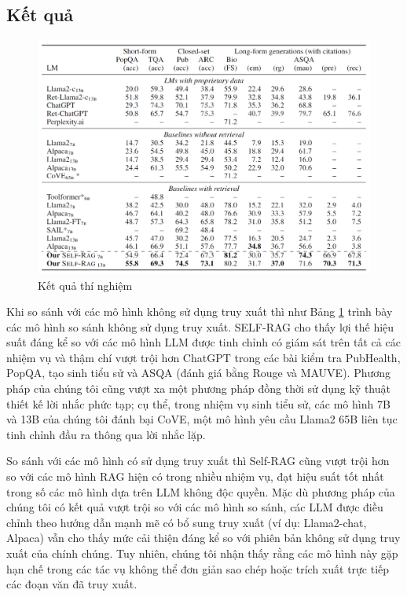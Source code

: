 \documentclass{article}
\begin{document}
\subsection{Kết quả}
\begin{figure} 
    \centering
    \includegraphics[scale = 0.15]{experiments_results.png}
    \caption{Kết quả thí nghiệm}
    \label{fig:experiments_results}
\end{figure}

Khi so sánh với các mô hình không sử dụng truy xuất thì như Bảng \ref{fig:experiments_results} trình bày các mô hình so sánh không sử dụng truy xuất. SELF-RAG  cho thấy lợi thế hiệu suất đáng kể so với các mô hình LLM được tinh chỉnh có giám sát trên tất cả các nhiệm vụ và thậm chí vượt trội hơn ChatGPT trong các bài kiểm tra PubHealth, PopQA, tạo sinh tiểu sử và ASQA (đánh giá bằng Rouge và MAUVE). Phương pháp của chúng tôi cũng vượt xa một phương pháp đồng thời sử dụng kỹ thuật thiết kế lời nhắc phức tạp; cụ thể, trong nhiệm vụ sinh tiểu sử, các mô hình 7B và 13B của chúng tôi đánh bại CoVE, một mô hình yêu cầu Llama2 65B liên tục tinh chỉnh đầu ra thông qua lời nhắc lặp.

So sánh với các mô hình có sử dụng truy xuất thì Self-RAG cũng vượt trội hơn so với các mô hình RAG hiện có trong nhiều nhiệm vụ, đạt hiệu suất tốt nhất trong số các mô hình dựa trên LLM không độc quyền. Mặc dù phương pháp của chúng tôi có kết quả vượt trội so với các mô hình so sánh, các LLM được điều chỉnh theo hướng dẫn mạnh mẽ có bổ sung truy xuất (ví dụ: Llama2-chat, Alpaca) vẫn cho thấy mức cải thiện đáng kể so với phiên bản không sử dụng truy xuất của chính chúng. Tuy nhiên, chúng tôi nhận thấy rằng các mô hình này gặp hạn chế trong các tác vụ không thể đơn giản sao chép hoặc trích xuất trực tiếp các đoạn văn đã truy xuất.
\end{document}
